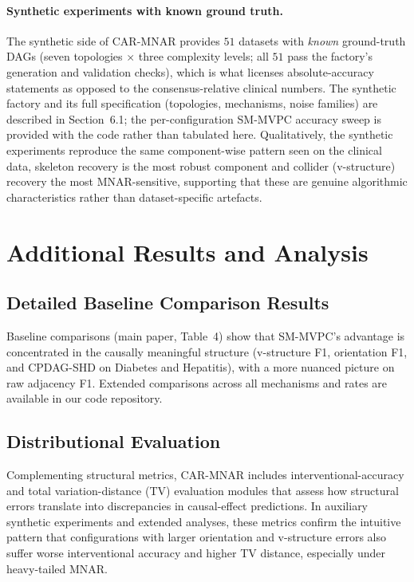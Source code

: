 \documentclass[runningheads]{llncs}
\newcommand{\Matin}{\textcolor{magenta}}
\begin{document}
\paragraph{Synthetic experiments with known ground truth.} 
The synthetic side of CAR-MNAR provides $51$ datasets with \emph{known} ground-truth DAGs (seven topologies $\times$ three complexity levels; all $51$ pass the factory's generation and validation checks), which is what licenses absolute-accuracy statements as opposed to the consensus-relative clinical numbers. The synthetic factory and its full specification (topologies, mechanisms, noise families) are described in Section~6.1; the per-configuration SM-MVPC accuracy sweep is provided with the code rather than tabulated here. Qualitatively, the synthetic experiments reproduce the same component-wise pattern seen on the clinical data, skeleton recovery is the most robust component and collider (v-structure) recovery the most MNAR-sensitive, supporting that these are genuine algorithmic characteristics rather than dataset-specific artefacts.


\section{Additional Results and Analysis}

\subsection{Detailed Baseline Comparison Results}

Baseline comparisons (main paper, Table~4) show that SM-MVPC's advantage is concentrated in the causally meaningful structure (v-structure F1, orientation F1, and CPDAG-SHD on Diabetes and Hepatitis), with a more nuanced picture on raw adjacency F1. Extended comparisons across all mechanisms and rates are available in our code repository.

\subsection{Distributional Evaluation}

Complementing structural metrics, CAR-MNAR includes interventional-accuracy and total variation-distance (TV) evaluation modules that assess how structural errors translate into discrepancies in causal-effect predictions. In auxiliary synthetic experiments and extended analyses, these metrics confirm the intuitive pattern that configurations with larger orientation and v-structure errors also suffer worse interventional accuracy and higher TV distance, especially under heavy-tailed MNAR.
\end{document}
